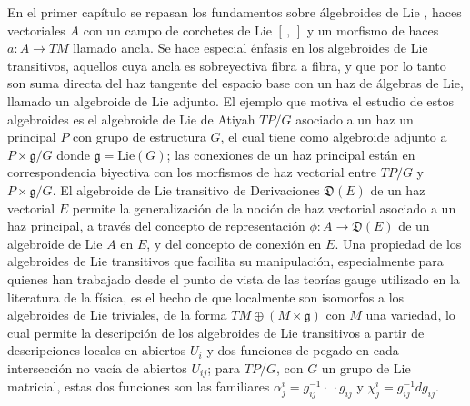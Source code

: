 \documentclass{article}
\begin{document}
En el primer capítulo se repasan los fundamentos sobre álgebroides de Lie
, haces vectoriales $A$ con un campo de corchetes de Lie $[\,,\,]$ y un morfismo de haces $a:A \to TM$ llamado ancla. Se hace especial énfasis en los algebroides de Lie transitivos, aquellos cuya ancla es sobreyectiva fibra a fibra, y que por lo tanto son suma directa del haz tangente del espacio base con un haz de álgebras de Lie, llamado un algebroide de Lie adjunto. El ejemplo que motiva el estudio de estos algebroides es el algebroide de Lie de Atiyah $TP/G$ asociado a un haz un principal $P$ con grupo de estructura $G$, el cual tiene como algebroide adjunto a $P \times \mathfrak g/G$ donde $\mathfrak g = \text{Lie}(G)$; las conexiones de un haz principal están en correspondencia biyectiva con los morfismos de haz vectorial entre $TP/G$ y $P \times \mathfrak g/G$. El algebroide de Lie transitivo de Derivaciones $\mathfrak D(E)$ de un haz vectorial $E$ permite la generalización de la noción de haz vectorial asociado a un haz principal, a través del concepto de representación $\phi: A \to \mathfrak D(E)$ de un algebroide de Lie $A$ en $E$, y del concepto de conexión en $E$. Una propiedad de los algebroides de Lie transitivos que facilita su manipulación, especialmente para quienes han trabajado desde el punto de vista de las teorías gauge utilizado en la literatura de la física, es el hecho de que localmente son isomorfos a los algebroides de Lie triviales, de la forma $TM\oplus (M \times \mathfrak g)$ con $M$ una variedad, lo cual permite la descripción de los algebroides de Lie transitivos a partir de descripciones locales en abiertos $U_i$ y dos funciones de pegado en cada intersección no vacía de abiertos $U_{ij}$; para $TP/G$, con $G$ un grupo de Lie matricial, estas dos funciones son las familiares $\alpha^i_j = g^{-1}_{ij}\cdot \, \cdot g_{ij}$ y $\chi^i_j = g_{ij}^{-1} dg_{ij}$.
\end{document}
